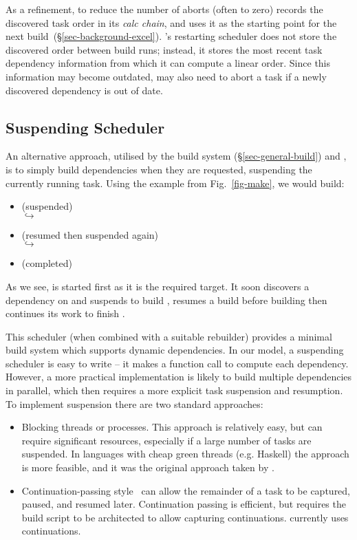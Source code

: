 As a refinement, to reduce the number of aborts (often to zero) \Excel records
the discovered task order in its \emph{calc chain}, and uses it as the starting
point for the next build~(\S\ref{sec-background-excel}). \Bazel's restarting
scheduler does not store the discovered order between build runs; instead, it
stores the most recent task dependency information from which it can compute a
linear order. Since this information may become outdated, \Bazel may also need
to abort a task if a newly discovered dependency is out of date.

\subsection{Suspending Scheduler}\label{sec-suspending}

An alternative approach, utilised by the  build system
(\S\ref{sec-general-build}) and \Shake, is to simply build dependencies when
they are requested, suspending the currently running task. Using the example
from Fig.~\ref{fig-make}, we would build:

\begin{itemize}
\item {} (suspended)\\
  $\hookrightarrow$ 
\item {} (resumed then suspended again)\\
  $\hookrightarrow$   
\item {} (completed)
\end{itemize}

\noindent
As we see,  is started first as it is the required target. It soon
discovers a dependency on  and suspends to build ,
resumes a build before building  then continues its work to finish
.

This scheduler (when combined with a suitable rebuilder) provides a minimal
build system which supports dynamic dependencies. In our model, a suspending
scheduler is easy to write -- it makes a function call to compute each
dependency. However, a more practical implementation is likely to build multiple
dependencies in parallel, which then requires a more explicit task suspension
and resumption. To implement suspension there are two standard approaches:

\begin{itemize}
\item Blocking threads or processes. This approach is relatively easy, but can
require significant resources, especially if a large number of tasks are
suspended. In languages with cheap green threads (e.g. Haskell) the approach is
more feasible, and it was the original approach taken by \Shake.
\item Continuation-passing style~\cite{claessen_continuations} can allow the
remainder of a task to be captured, paused, and resumed later. Continuation
passing is efficient, but requires the build script to be architected to allow
capturing continuations. \Shake currently uses continuations.
\end{itemize}

